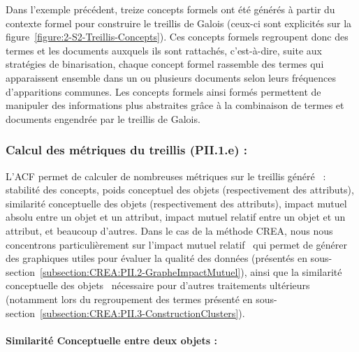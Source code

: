 \bigskip

Dans l'exemple précédent, treize concepts formels ont été générés à partir du contexte formel pour construire le treillis de Galois (ceux-ci sont explicités sur la figure~\ref{figure:2-S2-Treillis-Concepts}).
Ces concepts formels regroupent donc des termes et les documents auxquels ils sont rattachés, c'est-à-dire, suite aux stratégies de binarisation, chaque concept formel rassemble des termes qui apparaissent ensemble dans un ou plusieurs documents selon leurs fréquences d'apparitions communes.
Les concepts formels ainsi formés permettent de manipuler des informations plus abstraites grâce à la combinaison de termes et documents engendrée par le treillis de Galois.


\newpage %


\subsubsection{Calcul des métriques du treillis (PII.1.e) :}
\label{subsubsection:Contexte:ACF-MetriquesTreillis}

L'ACF permet de calculer de nombreuses métriques sur le treillis généré~\cite{babin2012approximating}\cite{jaffal2019aide} : stabilité des concepts, poids conceptuel des objets (respectivement des attributs), similarité conceptuelle des objets (respectivement des attributs), impact mutuel absolu entre un objet et un attribut, impact mutuel relatif entre un objet et un attribut, et beaucoup d'autres.
Dans le cas de la méthode CREA, nous nous concentrons particulièrement sur l'impact mutuel relatif~\cite{jaffal2019aide} qui permet de générer des graphiques utiles pour évaluer la qualité des données (présentés en sous-section~\ref{subsection:CREA:PII.2-GrapheImpactMutuel}), ainsi que la similarité conceptuelle des objets~\cite{jaffal2019aide} nécessaire pour d'autres traitements ultérieurs (notamment lors du regroupement des termes présenté en sous-section~\ref{subsection:CREA:PII.3-ConstructionClusters}).

\bigskip

\paragraph{Similarité Conceptuelle entre deux objets :}
\label{mystep:Contexte:ACF-MetriquesTreillis-SimilariteConceptuelle}

